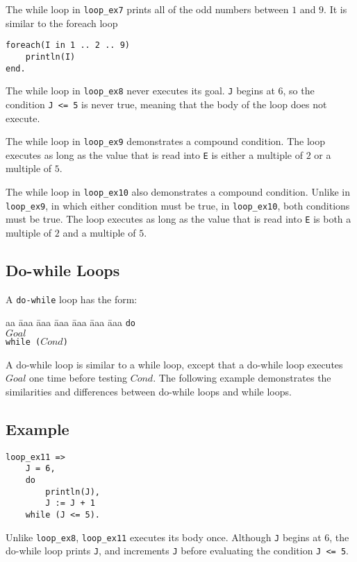The while loop in \texttt{loop\_ex7} prints all of the odd numbers between $1$ and $9$.  It is similar to the foreach loop
\begin{verbatim}
foreach(I in 1 .. 2 .. 9)
    println(I)
end.
\end{verbatim}

The while loop in \texttt{loop\_ex8} never executes its goal.  \texttt{J} begins at $6$, so the condition \texttt{J <= 5} is never true, meaning that the body of the loop does not execute.

The while loop in \texttt{loop\_ex9} demonstrates a compound condition.  The loop executes as long as the value that is read into \texttt{E} is either a multiple of $2$ or a multiple of $5$.

The while loop in \texttt{loop\_ex10} also demonstrates a compound condition.  Unlike in \texttt{loop\_ex9}, in which either condition must be true, in \texttt{loop\_ex10}, both conditions must be true.  The loop executes as long as the value that is read into \texttt{E} is both a multiple of $2$ and a multiple of $5$. 

\subsection{Do-while Loops}
A \texttt{do-while} loop has the form:
\begin{tabbing}
aa \= aaa \= aaa \= aaa \= aaa \= aaa \= aaa \kill
\> \texttt{do} \\
\> \> $Goal$  \\
\>  \texttt{while ($Cond$)}
\end{tabbing} 
A do-while loop is similar to a while loop, except that a do-while loop executes $Goal$ one time before testing $Cond$.  The following example demonstrates the similarities and differences between do-while loops and while loops.
\subsection*{Example}
\begin{verbatim}
loop_ex11 =>
    J = 6,
    do
        println(J),
        J := J + 1
    while (J <= 5).
\end{verbatim}

Unlike \texttt{loop\_ex8}, \texttt{loop\_ex11} executes its body once.  Although \texttt{J} begins at $6$, the do-while loop prints \texttt{J}, and increments \texttt{J} before evaluating the condition \texttt{J <= 5}.

